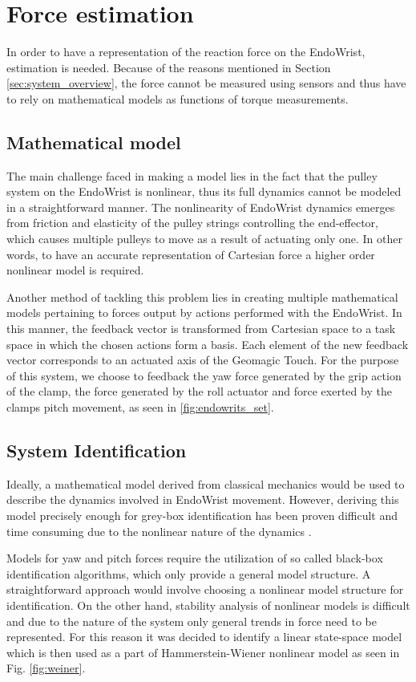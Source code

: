 \section{Force estimation}\label{sec:force_estimation}
In order to have a representation of the reaction force on the EndoWrist, estimation is needed.
Because of the reasons mentioned in Section \ref{sec:system_overview}, the force cannot be measured using sensors and thus have to rely on mathematical models as functions of torque measurements.

\subsection{Mathematical model}
The main challenge faced in making a model lies in the fact that the pulley system on the EndoWrist is nonlinear, thus its full dynamics cannot be modeled in a straightforward manner. 
The nonlinearity of EndoWrist dynamics emerges from friction and elasticity of the pulley strings controlling the end-effector, which causes multiple pulleys to move as a result of actuating only one. 
In other words, to have an accurate representation of Cartesian force a higher order nonlinear model is required.

Another method of tackling this problem lies in creating multiple mathematical models pertaining to forces output by actions performed with the EndoWrist.
In this manner, the feedback vector is transformed from Cartesian space to a task space in which the chosen actions form a basis.
Each element of the new feedback vector corresponds to an actuated axis of the Geomagic Touch.
For the purpose of this system, we choose to feedback the yaw force generated by the grip action of the clamp, the force generated by the roll actuator and force exerted by the clamps pitch movement, as seen in \ref{fig:endowrits_set}.

\subsection{System Identification}
Ideally, a mathematical model derived from classical mechanics would be used to describe the dynamics involved in EndoWrist movement.
However, deriving this model precisely enough for grey-box identification has been proven difficult and time consuming due to the nonlinear nature of the dynamics \cite{kim2014dynamic}.

Models for yaw and pitch forces require the utilization of so called black-box identification algorithms, which only provide a general model structure. 
A straightforward approach would involve choosing a nonlinear model structure for identification.
On the other hand, stability analysis of nonlinear models is difficult and due to the nature of the system only general trends in force need to be represented.
For this reason it was decided to identify a linear state-space model which is then used as a part of Hammerstein-Wiener  \cite{zhu2002estimation} nonlinear model as seen in Fig. \ref{fig:weiner}.


